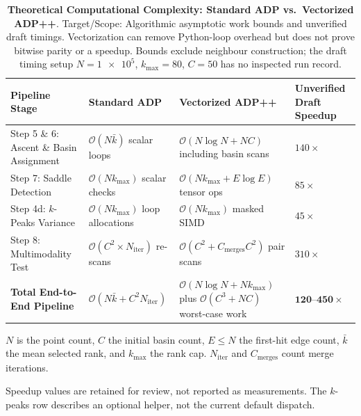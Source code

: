 \begin{landscape}
  \begin{table}[htbp]
    \centering
    \small
    \caption{\textbf{Theoretical Computational Complexity: Standard
      ADP vs.\ Vectorized ADP++}. Target/Scope: Algorithmic asymptotic
      work bounds and unverified draft timings. Vectorization can remove
      Python-loop overhead but does not prove bitwise parity or a speedup.
      Bounds exclude neighbour construction; the draft timing setup
    $N=\num{1e5}$, $k_{\max}=80$, $C=50$ has no inspected run record.}
    \label{tab:complexity_comparison}
    \begin{threeparttable}
      \begin{tabularx}{\linewidth}{>{\raggedright\arraybackslash}X
          >{\raggedright\arraybackslash}X >{\raggedright\arraybackslash}X
        >{\raggedright\arraybackslash}X}
        \toprule
        \textbf{Pipeline Stage} & \textbf{Standard \textsc{ADP}} &
        \textbf{Vectorized \textsc{ADP++}} & \textbf{Unverified
        Draft Speedup} \\
        \midrule
        Step 5 \& 6: Ascent \& Basin Assignment & $\mathcal{O}(N
        \bar{k})$ scalar loops & $\mathcal{O}(N\log N+NC)$ including
        basin scans
        & $\num{140}\times$ \\
        Step 7: Saddle Detection & $\mathcal{O}(N k_{\max})$ scalar
        checks & $\mathcal{O}(N k_{\max} + E\log E)$ tensor ops &
        $\num{85}\times$ \\
        Step 4d: $k$-Peaks Variance & $\mathcal{O}(N k_{\max})$ loop
        allocations & $\mathcal{O}(N k_{\max})$ masked SIMD &
        $\num{45}\times$ \\
        Step 8: Multimodality Test & $\mathcal{O}(C^2 \times
        N_{\mathrm{iter}})$ re-scans & $\mathcal{O}(C^2 +
        C_{\mathrm{merges}} C^2)$ pair scans & $\num{310}\times$ \\
        \textbf{Total End-to-End Pipeline} & $\mathcal{O}(N \bar{k} +
        C^2 N_{\mathrm{iter}})$ & $\mathcal{O}(N\log N+Nk_{\max})$
        plus $\mathcal{O}(C^3+NC)$ worst-case work &
        $\mathbf{\numrange{120}{450}\times}$ \\
        \bottomrule
      \end{tabularx}
      \begin{tablenotes}[flushleft]
        \footnotesize
      \item [Derived Work Bound] $N$ is the point count, $C$ the
        initial basin count, $E\le N$ the first-hit edge count,
        $\bar k$ the mean selected rank, and $k_{\max}$ the rank cap.
        $N_{\mathrm{iter}}$ and $C_{\mathrm{merges}}$ count merge iterations.
      \item [Unverified Draft] Speedup values are retained for review,
        not reported as measurements. The $k$-peaks row describes
        an optional helper, not the current default dispatch.
      \end{tablenotes}
    \end{threeparttable}
  \end{table}
\end{landscape}
